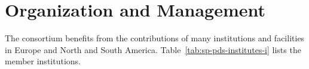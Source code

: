 \section{Organization and Management}
\label{sec:fdsp-pd-org}

The   consortium benefits from the contributions of many institutions and facilities in Europe and North and South America.  Table~\ref{tab:sp-pds-institutes-i}
lists the member institutions. 

\label{sec:fdsp-pd-org-consortium}

